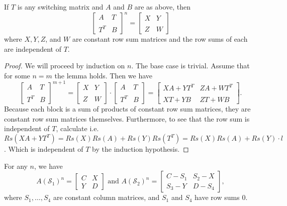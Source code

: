 \begin{lemma}\label{lemma:SwitchedPowers1}
    If $T$ is any switching matrix and $A$ and $B$ are as above, then 
    $$
      \begin{bmatrix}
        A & T \\\\
        T^T & B
      \end{bmatrix}^n = \begin{bmatrix}
        X & Y \\\\
        Z & W
      \end{bmatrix}
    $$ where $X, Y, Z$, and $W$ are constant row sum matrices and the row sums of each are independent of $T$.
\end{lemma}

\begin{proof} We will proceed by induction on $n$. The base case is trivial. Assume that for some $n = m$ the lemma holds. Then we have
  $$
    \begin{bmatrix}
      A & T \\\\
      T^T & B
    \end{bmatrix}^{m+1} = \begin{bmatrix}
      X & Y \\\\
      Z & W
    \end{bmatrix} \cdot \begin{bmatrix}
      A & T \\\\
      T^T & B
    \end{bmatrix} = \begin{bmatrix}
      XA + YT^T & ZA + WT^T \\\\
      XT + YB & ZT + WB
    \end{bmatrix}.
  $$
  Because each block is a sum of products of constant row sum matrices, they are constant row sum matrices themselves. Furthermore, to see that the row sum is independent of $T$, calculate i.e. $Rs(XA + YT^T) = Rs(X)Rs(A) + Rs(Y)Rs(T^T) = Rs(X)Rs(A) + Rs(Y) \cdot l$. Which is independent of $T$ by the induction hypothesis.
\end{proof}


\begin{lemma}\label{lemma:SwitchedPowers2}
  For any $n$, we have $$A(\mathcal{S}_1)^n = \begin{bmatrix}
    C & X \\
    Y & D
  \end{bmatrix} \text{ and }
    A(\mathcal{S}_2)^n = \begin{bmatrix}
      C - S_1 & S_2 - X \\
      S_3 - Y & D - S_4
  \end{bmatrix},$$ where $S_1,\ldots,S_4$ are constant column matrices, and $S_1$ and $S_4$ have row sums $0$.
\end{lemma}

